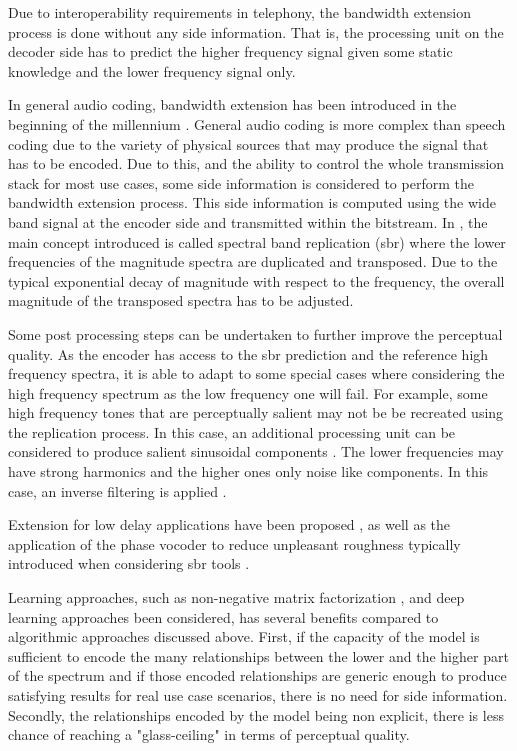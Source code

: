 \documentclass{article}
\begin{document}
Due to interoperability requirements in telephony, the bandwidth extension process is done without any side information. That is, the processing unit on the decoder side has to predict the higher frequency signal given some static knowledge and the lower frequency signal only.

In general audio coding, bandwidth extension has been introduced in the beginning of the millennium \cite{dietz2002spectral}. General audio coding is more complex than speech coding due to the variety of physical sources that may produce the signal that has to be encoded. Due to this, and the ability to control the whole transmission stack for most use cases, some side information is considered to perform the bandwidth extension process. This side information is computed using the wide band signal at the encoder side and transmitted within the bitstream. In \cite{dietz2002spectral}, the main concept introduced is called spectral band replication (sbr) where the lower frequencies of the magnitude spectra are duplicated and transposed. Due to the typical exponential decay of magnitude with respect to the frequency, the overall magnitude of the transposed spectra has to be adjusted.

Some post processing steps can be undertaken to further improve the perceptual quality. As the encoder has access to the sbr prediction and the reference high frequency spectra, it is able to adapt to some special cases where considering the high frequency spectrum as the low frequency one will fail. For example, some high frequency tones that are perceptually salient may not be be recreated using the replication process. In this case, an additional processing unit can be considered to produce salient sinusoidal components \cite{ekstrand2002bandwidth}. The lower frequencies may have strong harmonics and the higher ones only noise like components. In this case, an inverse filtering is applied \cite{ehret2004audio}.

Extension for low delay applications have been proposed \cite{friedrich2007spectral}, as well as the application of the phase vocoder \cite{flanagan1966phase} to reduce unpleasant roughness typically introduced when considering sbr tools \cite{nagel2009harmonic}.

Learning approaches, such as non-negative matrix factorization \cite{sun2013non}, and deep learning approaches \cite{miron2018high} been considered, has several benefits compared to algorithmic approaches discussed above. First, if the capacity of the model is sufficient to encode the many relationships between the lower and the higher part of the spectrum and if those encoded relationships are generic enough to produce satisfying results for real use case scenarios, there is no need for side information. Secondly, the relationships encoded by the model being non explicit, there is less chance of reaching a "glass-ceiling" in terms of perceptual quality.
\end{document}
